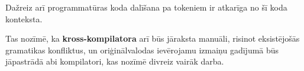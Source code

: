 Dažreiz arī programmatūras koda dalīšana pa tokeniem ir atkarīga no šī koda konteksta. 

Tas nozīmē, ka \textbf{kross-kompilatora} arī būs jāraksta manuāli, risinot eksistējošās gramatikas konfliktus, un oriģinālvalodas ievērojamu izmaiņu gadījumā būs jāpastrādā abi kompilatori, kas nozīmē divreiz vairāk darba.